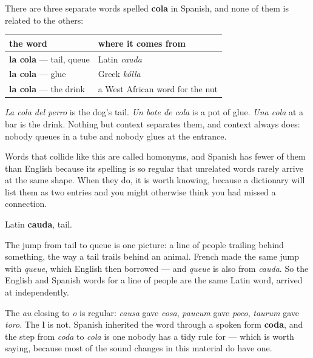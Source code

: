 \begin{grammarlens}[title={Grammar Lens: two colas, and one of them is glue}]
There are three separate words spelled \textbf{cola} in Spanish, and none of them is related to the others:

\noindent
\begin{tabularx}{\linewidth}{@{}>{\raggedright\arraybackslash}X>{\raggedright\arraybackslash}X@{}}
\toprule
\textbf{the word} & \textbf{where it comes from} \\
\midrule
\textbf{la cola} — tail, queue & Latin \emph{cauda} \\
\textbf{la cola} — glue & Greek \emph{kólla} \\
\textbf{la cola} — the drink & a West African word for the nut \\
\bottomrule
\end{tabularx}

\emph{La cola del perro} is the dog's tail. \emph{Un bote de cola} is a pot of glue. \emph{Una cola} at a bar is the drink. Nothing but context separates them, and context always does: nobody queues in a tube and nobody glues at the entrance.

Words that collide like this are called homonyms, and Spanish has fewer of them than English because its spelling is so regular that unrelated words rarely arrive at the same shape. When they do, it is worth knowing, because a dictionary will list them as two entries and you might otherwise think you had missed a connection.
\end{grammarlens}

\begin{cousinweb}
Latin \textbf{cauda}, tail.

The jump from tail to queue is one picture: a line of people trailing behind something, the way a tail trails behind an animal. French made the same jump with \emph{queue}, which English then borrowed — and \emph{queue} is also from \emph{cauda}. So the English and Spanish words for a line of people are the same Latin word, arrived at independently.

The \emph{au} closing to \emph{o} is regular: \emph{causa} gave \emph{cosa}, \emph{paucum} gave \emph{poco}, \emph{taurum} gave \emph{toro}. The \textbf{l} is not. Spanish inherited the word through a spoken form \textbf{coda}, and the step from \emph{coda} to \emph{cola} is one nobody has a tidy rule for — which is worth saying, because most of the sound changes in this material do have one.
\end{cousinweb}


